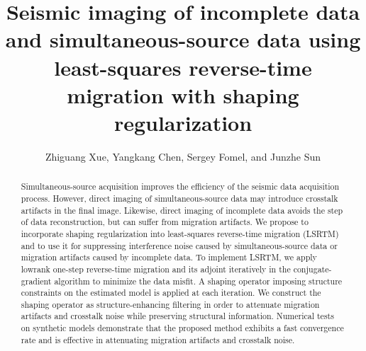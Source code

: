 \title{Seismic imaging of incomplete data and simultaneous-source data using least-squares reverse-time migration with shaping regularization}
\author{Zhiguang Xue, Yangkang Chen, Sergey Fomel, and Junzhe Sun}
\maketitle

\address{
Bureau of Economic Geology \\
John A. and Katherine G. Jackson School of Geosciences \\
The University of Texas at Austin \\
University Station, Box X \\
Austin, TX 78713-8924 \\
}


\begin{abstract}
Simultaneous-source acquisition improves the efficiency of the seismic data acquisition process.
However, direct imaging of simultaneous-source data may introduce crosstalk artifacts in the final image.
Likewise, direct imaging of incomplete data avoids the step of data reconstruction, but can suffer from migration artifacts.
We propose to incorporate shaping regularization into least-squares reverse-time migration (LSRTM) and 
to use it for suppressing interference noise caused by simultaneous-source data or migration artifacts caused by incomplete data.
To implement LSRTM, we apply lowrank one-step reverse-time migration and its adjoint iteratively in the conjugate-gradient algorithm 
to minimize the data misfit.
A shaping operator imposing structure constraints on the estimated model is applied at each iteration.
We construct the shaping operator as structure-enhancing filtering 
in order to attenuate migration artifacts and crosstalk noise while preserving structural information.
Numerical tests on synthetic models demonstrate that 
the proposed method exhibits a fast convergence rate 
and is effective in attenuating migration artifacts and crosstalk noise.
\end{abstract}

